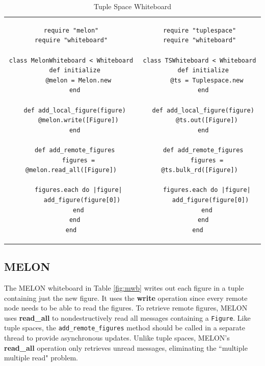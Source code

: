 \begin{table}
\centering
\begin{tabular}{c c}
\begin{minipage}{2.75in}
\begin{verbatim}
require "melon"
require "whiteboard"

class MelonWhiteboard < Whiteboard
  def initialize
    @melon = Melon.new
  end
  
  def add_local_figure(figure)
    @melon.write([Figure])
  end

  def add_remote_figures
    figures = @melon.read_all([Figure])

    figures.each do |figure|
      add_figure(figure[0])
    end
  end
end
\end{verbatim}
\caption{MELON Whiteboard}\label{fig:mwb}
\end{minipage}
&
\begin{minipage}{2.5in}
\begin{verbatim}
require "tuplespace"
require "whiteboard"

class TSWhiteboard < Whiteboard
  def initialize
    @ts = Tuplespace.new
  end

  def add_local_figure(figure)
    @ts.out([Figure])
  end

  def add_remote_figures
    figures = @ts.bulk_rd([Figure])

    figures.each do |figure|
      add_figure(figure[0])
    end
  end
end 
\end{verbatim}
\caption{Tuple Space Whiteboard}\label{fig:tswb}
\end{minipage}
\end{tabular}
\end{table}

\subsection{MELON}

The MELON whiteboard in Table \ref{fig:mwb} writes out each figure in a tuple containing just the new figure. It uses the \textbf{write} operation since every remote node needs to be able to read the figures. To retrieve remote figures, MELON uses \textbf{read\_all} to nondestructively read all messages containing a \texttt{Figure}. Like tuple spaces, the \texttt{add\_remote\_figures} method should be called in a separate thread to provide asynchronous updates. Unlike tuple spaces, MELON's \textbf{read\_all} operation only retrieves unread messages, eliminating the ``multiple multiple read" problem.

